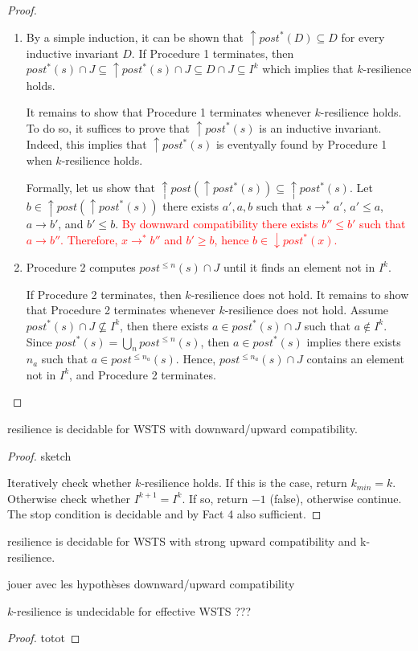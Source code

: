 \begin{proof}
\begin{enumerate}
\item By a simple induction, it can be shown that $\uparrow post^*(D) \subseteq D$ for every inductive invariant $D$. 
If Procedure 1 terminates, then
$post^*(s) \cap J \subseteq \uparrow post^*(s) \cap J \subseteq D  \cap J \subseteq I^k$
which implies that $k$-resilience holds.

It remains to show that Procedure 1 terminates whenever $k$-resilience holds. To do so, it suffices to prove that $\uparrow post^*(s)$ is an inductive invariant. Indeed, this implies that
$\uparrow post^*(s)$ is eventyally found by Procedure 1 when $k$-resilience holds. 

Formally, let us show that $\uparrow post(\uparrow post^*(s)) \subseteq \uparrow post^*(s)$.
Let $b \in \uparrow post(\uparrow post^*(s))$ 
there exists $a', a, b$ such that
$s \rightarrow^* a'$,
$a' \leq a$,
$a \rightarrow b'$,
and
$b' \leq b$.
\textcolor{red}{By downward compatibility 
there exists $b'' \leq b'$ such that $a \rightarrow b'' $. Therefore, $x \rightarrow^* b''$ and $b' \geq b$, hence $b \in \downarrow post^*(x)$.}
\item Procedure 2 computes
 $post^{\leq n}(s) \cap J$
 until it finds an element not in $ I^k$.

If Procedure 2 terminates, then
$k$-resilience does not hold.
It remains to show that Procedure 2 terminates whenever $k$-resilience does not hold.
Assume $ post^*(s) \cap J \not\subseteq I^k$, then there exists $a \in post^*(s) \cap J$ such that $a \not\in I^k$. Since $post^*(s) = \bigcup_{n} post^{\leq n}(s)$, then 
$a \in post^*(s)$
implies
there exists
$n_a$
such that
$a \in post^{\leq n_a}(s)$.
Hence,  $post^{\leq n_a}(s) \cap J$ contains an element not in 
$I^k$,
and Procedure 2 terminates.
\end{enumerate}

\end{proof}



\begin{theorem}
{\sc resilience} is decidable for WSTS with downward/upward compatibility.
\end{theorem}

\begin{proof}{sketch}

Iteratively check whether $k$-resilience holds. 
If this is the case, return $k_{min} = k$. Otherwise check whether 
$I^{k+1} = I^k$. If so, return $-1$ (false), otherwise
continue.
The stop condition is decidable
and by Fact 4 also sufficient. 
\end{proof}

{\sc resilience} is decidable for WSTS with strong upward compatibility and k-resilience.

jouer avec les hypothèses downward/upward compatibility

\begin{theorem}
{\sc $k$-resilience} is undecidable for effective WSTS ???
\end{theorem}

\begin{proof}
totot
\end{proof}

